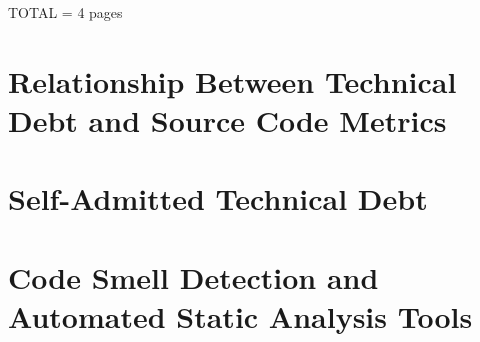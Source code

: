 \label{sec:RevLitt}

TOTAL = 4 pages

\section{Relationship Between Technical Debt and Source Code Metrics}

\section{Self-Admitted Technical Debt}

\section{Code Smell Detection and Automated Static Analysis Tools}
